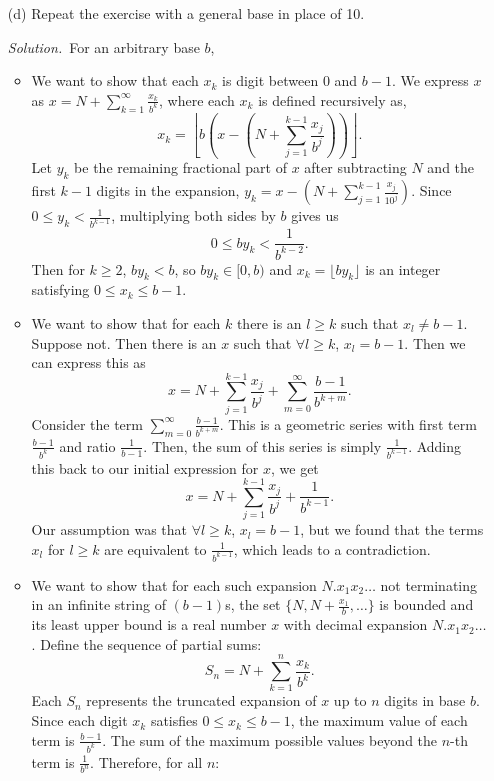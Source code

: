 \documentclass[12pt]{article}
\renewcommand{\_}[1]{\underline{ #1 }}
\theoremstyle{definition}
\newenvironment{exercise}[1]
  {\renewcommand\theinnercustomthm{#1}\innercustomthm}
  {\endinnercustomthm}
\newenvironment{solution}{\par\noindent\textit{Solution.}\ }{\par}
\numberwithin{equation}{subsection}
\begin{document}
\begin{exercise}{18}
\begin{itemize}
\begin{proof}
        \end{proof}
        \item [(d)] Repeat the exercise with a general base in place of 10. 
        \begin{solution}For an arbitrary base $b$,
        \begin{itemize}
            \item  We want to show that each $x_k$ is digit between 0 and $b-1$. We express $x$ as $x = N + \sum_{k = 1}^\infty \frac{x_k}{b^k}$, where each $x_k$ is defined recursively as, $$x_k = \left\lfloor b \left( x - \left( N + \sum_{j = 1}^{k -1} \frac{x_j}{b^j} \right) \right) \right\rfloor.$$ Let $y_k$ be the remaining fractional part of $x$ after subtracting $N$ and the first $k - 1$ digits in the expansion, $y_k = x - \left( N + \sum_{j = 1}^{k-1} \frac{x_j}{10^j} \right)$. Since $0 \le y_k < \frac{1}{b^{k-1}}$, multiplying both sides by $b$ gives us $$0 \le by_k < \frac{1}{b^{k-2}}.$$ Then for $k \ge 2$, $by_k < b$, so $by_k \in [0, b)$ and $x_k = \lfloor by_k \rfloor$ is an integer satisfying $0 \le x_k \le b - 1$. 
            \item We want to show that for each $k$ there is an $l \ge k$ such that $x_l \neq b-1$. Suppose not. Then there is an $x$ such that $\forall l \ge k$, $x_l = b-1$. Then we can express this as $$x = N + \sum_{j = 1}^{k-1} \frac{x_j}{b^j} + \sum_{m = 0}^\infty \frac{b-1}{b^{k+m}}.$$ Consider the term $\sum_{m = 0}^\infty \frac{b-1}{b^{k+m}}$. This is a geometric series with first term $\frac{b-1}{b^k}$ and ratio $\frac{1}{b-1}$. Then, the sum of this series is simply $\frac{1}{b^{k - 1}}$. Adding this back to our initial expression for $x$, we get $$x = N + \sum_{j = 1}^{k-1} \frac{x_j}{b^j} + \frac{1}{b^{k - 1}}.$$ Our assumption was that $\forall l \ge k$, $x_l = b-1$, but we found that the terms $x_l$ for $l \ge k$ are equivalent to $\frac{1}{b^{k-1}}$, which leads to a contradiction. 
            \item We want to show that for each such expansion $N.x_1x_2\dots$ not terminating in an infinite string of $(b-1)$s, the set $\{ N, N + \frac{x_1}{b}, \dots \}$ is bounded and its least upper bound is a real number $x$ with decimal expansion $N.x_1x_2\dots$. Define the sequence of partial sums:
\[
S_n = N + \sum_{k=1}^n \frac{x_k}{b^k}.
\]
Each \( S_n \) represents the truncated expansion of \( x \) up to \( n \) digits in base \( b \). Since each digit \( x_k \) satisfies \( 0 \leq x_k \leq b - 1 \), the maximum value of each term is \( \frac{b - 1}{b^k} \). The sum of the maximum possible values beyond the \( n \)-th term is $\frac{1}{b^n}$. Therefore, for all \( n \):

\end{itemize}
\end{solution}
\end{itemize}
\end{exercise}
\end{document}
